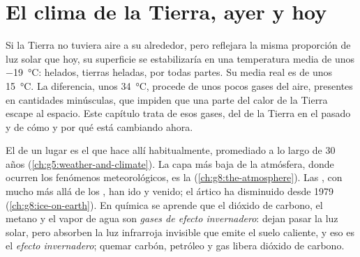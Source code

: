 \chapter{El clima de la Tierra, ayer y hoy}\label{ch:g9:climate-past-and-present}

Si la Tierra no tuviera aire a su alrededor, pero reflejara la misma
proporción de luz solar que hoy, su superficie se estabilizaría en una
temperatura media de unos \qty{-19}{\degreeCelsius}:  helados, tierras
heladas, por todas partes. Su media real es de unos
\qty{15}{\degreeCelsius}. La diferencia, unos \qty{34}{\degreeCelsius},
procede de unos pocos gases del aire, presentes en cantidades minúsculas,
que impiden que una parte del calor de la Tierra escape al espacio. Este
capítulo trata de esos gases, del  de la Tierra en el pasado y de
cómo y por qué está cambiando ahora.

\begin{recall}
El  de un lugar es el  que hace allí habitualmente, promediado
a lo largo de 30 años (\cref{ch:g5:weather-and-climate}). La capa más baja
de la atmósfera, donde ocurren los fenómenos meteorológicos, es la
 (\cref{ch:g8:the-atmosphere}). Las , con 
mucho más allá de los , han ido y venido; el  ártico ha
disminuido desde 1979 (\cref{ch:g8:ice-on-earth}). En química se aprende
que el dióxido de carbono, el metano y el vapor de agua son \emph{gases de
efecto invernadero}: dejan pasar la luz solar, pero absorben la luz
infrarroja invisible que emite el suelo caliente, y eso es el
\emph{efecto invernadero}; quemar carbón, petróleo y gas libera dióxido de
carbono.
\end{recall}


